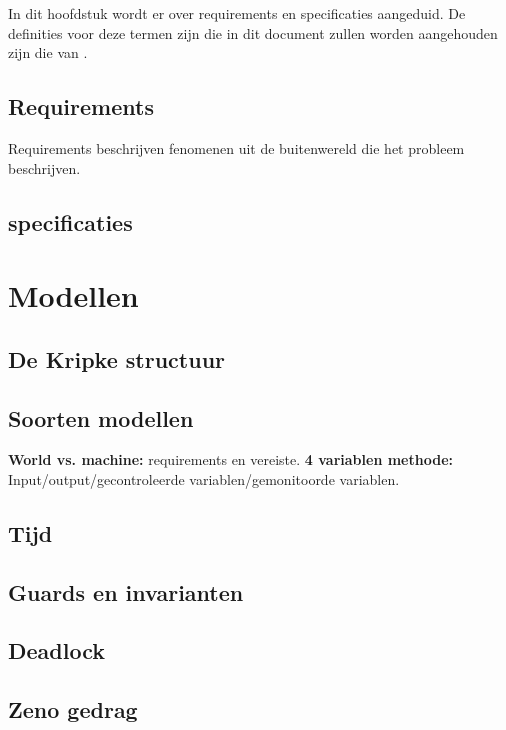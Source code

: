\documentclass{article}
\begin{document}
In dit hoofdstuk wordt er over requirements en specificaties aangeduid. De definities voor deze termen zijn die in dit document zullen worden aangehouden zijn die van \cite{gunter2000reference}. \newline

\subsection{Requirements}

Requirements beschrijven fenomenen uit de buitenwereld die het probleem beschrijven. 


\subsection{specificaties}

\section{Modellen}

\subsection{De Kripke structuur}

\subsection{Soorten modellen}

\textbf{World vs. machine:}
requirements en vereiste.
\textbf{4 variablen methode:}
Input/output/gecontroleerde variablen/gemonitoorde variablen.
\subsection{Tijd}

\subsection{Guards en invarianten}

\subsection{Deadlock}

\subsection{Zeno gedrag}
\end{document}
